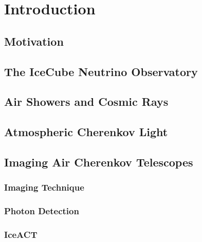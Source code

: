 \chapter{Introduction}

\section{Motivation}

\section{The IceCube Neutrino Observatory}

\section{Air Showers and Cosmic Rays}

\section{Atmospheric Cherenkov Light}

\section{Imaging Air Cherenkov Telescopes}

\subsection{Imaging Technique}

\subsection{Photon Detection}

\subsection{IceACT}